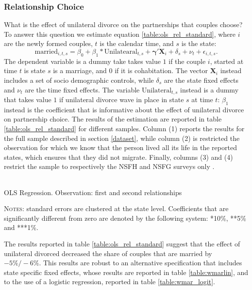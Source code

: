 \documentclass[12pt]{article}
\numberwithin{table}{section}
\begin{document}
\subsubsection*{Relationship Choice}
What is the effect of unilateral divorce on the partnerships that couples choose? To answer this question we estimate equation \ref{table:ols_rel_standard}, where $i$ are the newly formed couples, $t$ is the calendar time, and $s$ is the state: 
\begin{equation}\label{eq:ols_baseline}
\text{married}_{i,t,s}=\beta_0+\beta_1*\text{Unilatearal}_{t,s}+\mathbf{\gamma'}\mathbf{X}_i+\delta_s+\nu_t+\epsilon_{i,t,s}.
\end{equation}
The dependent variable is a dummy take takes value $1$ if the couple $i$, started at time $t$ is state $s$ is a marriage, and 0 if it is cohabitation. The vector $\mathbf{X}_i$ instead includes a set of socio demographic controls, while $\delta_s$ are the state fixed effects and  $\nu_t$ are the time fixed effects. The variable $\text{Unilateral}_{t,s}$ instead is a dummy that takes value $1$ if unilateral divorce wave in place in state $s$ at time $t$: $\beta_1$ instead is the coefficient that is informative about the effect of unilateral divorce on partnership choice. The results of the estimation are reported in table \ref{table:ols_rel_standard} for different samples. Column (1) reports the results for the full sample described in section \ref{dataset}, while column (2) is restricted the observation for which we know that the person lived all its life in the reported states, which ensures that they did not migrate. Finally, columns (3) and (4) restrict the sample to respectively the NSFH and NSFG surveys only .

	\begin{table}[htbp]\centering
		\caption{\\OLS Regression. Observation: first and second relationships}
		\label{table:ols_rel_standard}
		\begin{threeparttable}[t]\centering
			
	\begin{tablenotes}[flushleft]
		\footnotesize{\item \textsc{Notes}: standard errors are clustered at the state level.
			Coefficients that are significantly different from zero are denoted by the following system: *10\%, **5\%  and ***1\%.}
	\end{tablenotes}
\end{threeparttable}
\end{table}
\FloatBarrier
The results reported in table \ref{table:ols_rel_standard} suggest that the effect of unilateral divorced decreased the share of couples that are married by $-5\%/-6\%$. This results are robust to an alternative specification that includes state specific fixed effects, whose results are reported in  table \ref{table:wmarlin}, and to the use of a logistic regression, reported in table \ref{table:wmar_logit}.
\end{document}
